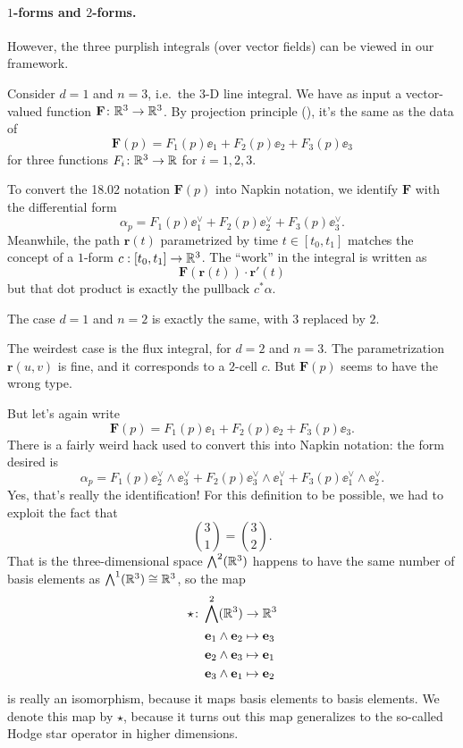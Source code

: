 \paragraph{$1$-forms and $2$-forms.}
However, the three purplish integrals (over vector fields) can be viewed in our framework.
\begin{itemize}
	\ii Consider $d = 1$ and $n = 3$, i.e.\ the 3-D line integral.
	We have as input a vector-valued function $\mathbf{F} \colon \mathbb R^3 \to \mathbb R^3$.
	By projection principle (), it's the same as the data of
	\[ \mathbf{F}(p) = F_1(p) \ee_1 + F_2(p) \ee_2 + F_3(p) \ee_3 \]
	for three functions $F_i \colon \mathbb R^3 \to \mathbb R$ for $i = 1, 2, 3$.

	To convert the 18.02 notation $\mathbf{F}(p)$ into Napkin notation,
	we identify $\mathbf{F}$ with the differential form
	\[ \alpha_p = F_1(p) \ee_1^\vee + F_2(p) \ee_2^\vee + F_3(p) \ee_3^\vee. \]
	Meanwhile, the path $\mathbf{r}(t)$ parametrized by time $t \in [t_0, t_1]$
	matches the concept of a $1$-form $c : [t_0, t_1] \to \mathbb R^3$.
	The ``work'' in the integral is written as
	\[ \mathbf F(\mathbf{r}(t)) \cdot \mathbf{r}'(t) \]
	but that dot product is exactly the pullback $c^\ast\alpha$.

	\ii The case $d = 1$ and $n = 2$ is exactly the same, with $3$ replaced by $2$.

	\ii The weirdest case is the flux integral, for $d = 2$ and $n = 3$.
	The parametrization $\mathbf{r}(u,v)$ is fine, and it corresponds to a $2$-cell $c$.
	But $\mathbf{F}(p)$ seems to have the wrong type.

	But let's again write
	\[ \mathbf{F}(p) = F_1(p) \ee_1 + F_2(p) \ee_2 + F_3(p) \ee_3. \]
	There is a fairly weird hack used to convert this into Napkin notation: the form desired is
	\[ \alpha_p = F_1(p) \ee_2^\vee \wedge \ee_3^\vee
		+ F_2(p) \ee_3^\vee \wedge \ee_1^\vee
		+ F_3(p) \ee_1^\vee \wedge \ee_2^\vee. \]
	Yes, that's really the identification!
	For this definition to be possible, we had to exploit the fact that
	\[ \binom 31 = \binom 32. \]
	That is the three-dimensional space $\bigwedge^2(\mathbb R^3)$
	happens to have the same number of basis elements as $\bigwedge^1(\mathbb R^3) \cong \mathbb R^3$, so the map
	\begin{align*}
		\star \colon \bigwedge^2(\mathbb R^3) &\to \mathbb R^3 \\
		\mathbf e_1 \wedge \mathbf e_2 &\mapsto \mathbf e_3 \\
		\mathbf e_2 \wedge \mathbf e_3 &\mapsto \mathbf e_1 \\
		\mathbf e_3 \wedge \mathbf e_1 &\mapsto \mathbf e_2
	\end{align*}
	is really an isomorphism, because it maps basis elements to basis elements.
	We denote this map by $\star$,
	because it turns out this map generalizes to the so-called Hodge star operator in higher dimensions.


\end{itemize}
